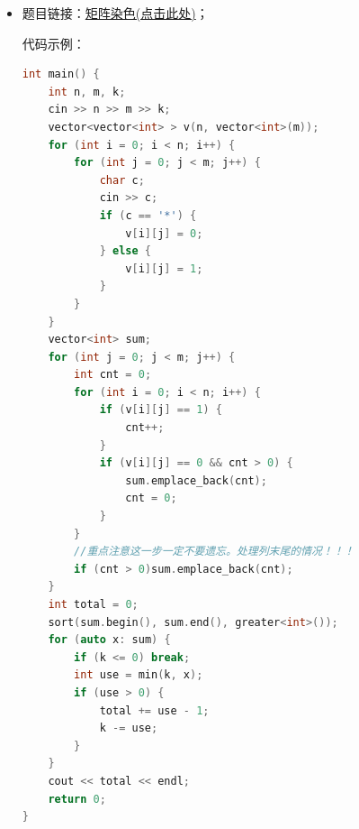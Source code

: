 \begin{itemize}
\begin{lstlisting}[language=C++]
// 检查日期是否合法
bool check(int date) {
	int year = date / 10000;
	int month = date % 10000 / 100;
	int day = date % 100;
	
	if (month == 0 || month > 12) return false;
	if (day == 0) return false;
	
	// 针对 2 月处理闰年
	if (month != 2) {
		if (day > days[month]) return false;
	} else {
		bool leap = (year % 4 == 0 && year % 100 != 0) || (year % 400 == 0);
		if (day > 28 + leap) return false;
	}
	return true;
}

int main() {
	int date1, date2;
	cin >> date1 >> date2;
	
	int ans = 0;
	// 策略：枚举年份（前四位）
	for (int i = 1000; i <= 9999; i++) {
		// 构建回文：把 i 翻转作为后四位
		// 例如 i = 2021, t = 1202
		int t = i, date = i;
		for (int j = 0; j < 4; j++) {
			date = date * 10 + t % 10;
			t /= 10;
		}
		
		// 判断构造出的日期是否在范围内，且日期本身合法
		if (date >= date1 && date <= date2 && check(date)) {
			ans++;
		}
	}
	
	cout << ans << endl;
	return 0;
}
\end{lstlisting}
\textcolor{red}{总结：要是从其实日期一直遍历到终止日期太过复杂要考虑闰年还有年份天数等多种情况，所以我们就选择遍历所有年份看看对应回文串的日期和天数是否合法即可}：要多培养逆向思维！！！

\subsubsection{BGN24 小红的矩阵染色}
\item 题目链接：\href{https://www.nowcoder.com/practice/f8b771318bb04490b7389cc35e148166?tpId=385&tags=&title=&difficulty=0&judgeStatus=0&rp=0&sourceUrl=%2Fexam%2Foj%3Fpage%3D1%26tab%3D%25E7%25AE%2597%25E6%25B3%2595%25E5%25AD%25A6%25E4%25B9%25A0%25E7%25AF%2587%26topicId%3D385}{矩阵染色(点击此处)}；

代码示例：\\
\begin{lstlisting}[language=C++]
int main() {
	int n, m, k;
	cin >> n >> m >> k;
	vector<vector<int> > v(n, vector<int>(m));
	for (int i = 0; i < n; i++) {
		for (int j = 0; j < m; j++) {
			char c;
			cin >> c;
			if (c == '*') {
				v[i][j] = 0;
			} else {
				v[i][j] = 1;
			}
		}
	}
	vector<int> sum;
	for (int j = 0; j < m; j++) {
		int cnt = 0;
		for (int i = 0; i < n; i++) {
			if (v[i][j] == 1) {
				cnt++;
			}
			if (v[i][j] == 0 && cnt > 0) {
				sum.emplace_back(cnt);
				cnt = 0;
			}
		}
		//重点注意这一步一定不要遗忘。处理列末尾的情况！！！
		if (cnt > 0)sum.emplace_back(cnt);
	}
	int total = 0;
	sort(sum.begin(), sum.end(), greater<int>());
	for (auto x: sum) {
		if (k <= 0) break;
		int use = min(k, x);
		if (use > 0) {
			total += use - 1;
			k -= use;
		}
	}
	cout << total << endl;
	return 0;
}
\end{lstlisting}

\end{itemize}
